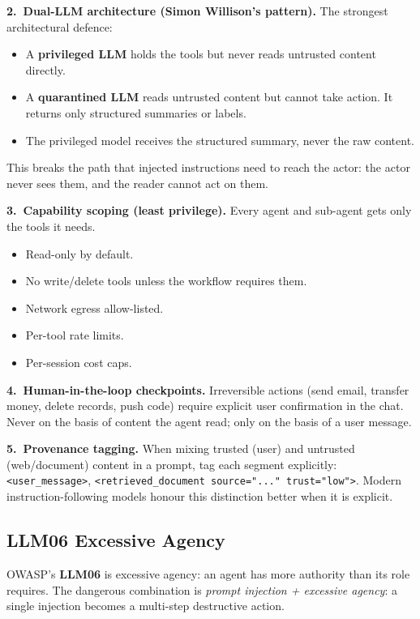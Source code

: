 \documentclass[a4paper,11pt]{article}
\begin{document}
\textbf{2.\ Dual-LLM architecture (Simon Willison's pattern).} The
strongest architectural defence:

\begin{itemize}[noitemsep, leftmargin=1.2em]
  \item A \textbf{privileged LLM} holds the tools but never reads
        untrusted content directly.
  \item A \textbf{quarantined LLM} reads untrusted content but
        cannot take action. It returns only structured summaries or
        labels.
  \item The privileged model receives the structured summary, never
        the raw content.
\end{itemize}

This breaks the path that injected instructions need to reach the
actor: the actor never sees them, and the reader cannot act on them.

\textbf{3.\ Capability scoping (least privilege).} Every agent and
sub-agent gets only the tools it needs.

\begin{itemize}[noitemsep, leftmargin=1.2em]
  \item Read-only by default.
  \item No write/delete tools unless the workflow requires them.
  \item Network egress allow-listed.
  \item Per-tool rate limits.
  \item Per-session cost caps.
\end{itemize}

\textbf{4.\ Human-in-the-loop checkpoints.} Irreversible actions
(send email, transfer money, delete records, push code) require
explicit user confirmation in the chat. Never on the basis of
content the agent read; only on the basis of a user message.

\textbf{5.\ Provenance tagging.} When mixing trusted (user) and
untrusted (web/document) content in a prompt, tag each segment
explicitly: \texttt{<user\_message>}, \texttt{<retrieved\_document
source="..." trust="low">}. Modern instruction-following models honour
this distinction better when it is explicit.

\subsection{LLM06 \textemdash{} Excessive Agency}

OWASP's \textbf{LLM06} is excessive agency: an agent has more
authority than its role requires. The dangerous combination is
\emph{prompt injection + excessive agency}: a single injection
becomes a multi-step destructive action.
\end{document}
